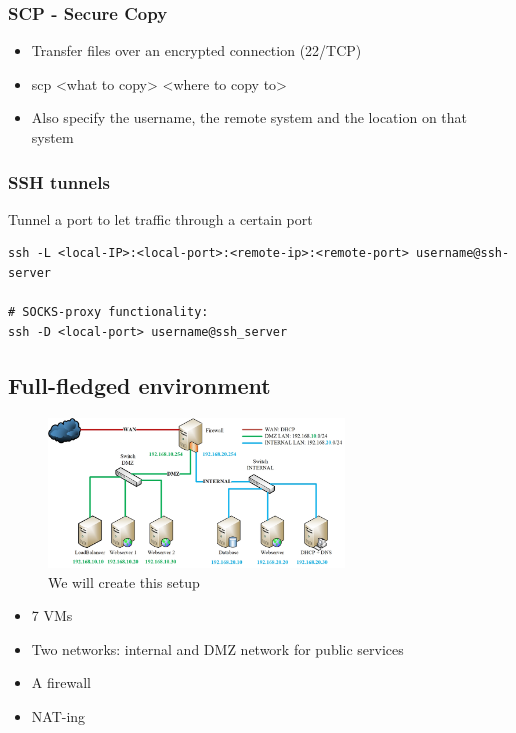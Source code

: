 \documentclass{article}
\begin{document}
\subsubsection{SCP - Secure Copy}

\begin{itemize}
    \item Transfer files over an encrypted connection (22/TCP)
    \item scp <what to copy> <where to copy to>
    \item Also specify the username, the remote system and the location on that system
\end{itemize}

\subsubsection{SSH tunnels}

Tunnel a port to let traffic through a certain port

\begin{verbatim}
ssh -L <local-IP>:<local-port>:<remote-ip>:<remote-port> username@ssh-server

# SOCKS-proxy functionality:
ssh -D <local-port> username@ssh_server
\end{verbatim}

\subsection{Full-fledged environment}

\begin{figure}[H]
    \centering
    \includegraphics[width=0.7\textwidth]{full-fledged-environment.jpg}
    \caption{We will create this setup}
\end{figure}

\begin{itemize}
    \item 7 VMs
    \item Two networks: internal and DMZ network for public services
    \item A firewall
    \item NAT-ing
\end{itemize}
\end{document}

